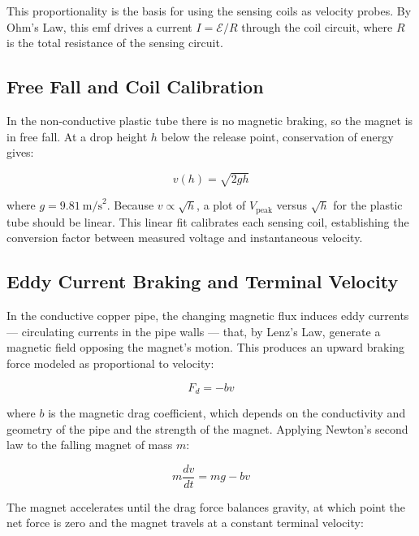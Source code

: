\documentclass[11pt]{article}
\begin{document}
\noindent This proportionality is the basis for using the sensing coils as velocity probes. By
Ohm's Law, this emf drives a current $I = \mathcal{E}/R$ through the coil circuit, where $R$ is
the total resistance of the sensing circuit.

\subsection*{Free Fall and Coil Calibration}

In the non-conductive plastic tube there is no magnetic braking, so the magnet is in free fall.
At a drop height $h$ below the release point, conservation of energy gives:

\begin{equation}
    v(h) = \sqrt{2gh}
    \label{eq:freefall}
\end{equation}

\noindent where $g = 9.81~\text{m/s}^2$. Because $v \propto \sqrt{h}$, a plot of $V_\text{peak}$
versus $\sqrt{h}$ for the plastic tube should be linear. This linear fit calibrates each sensing
coil, establishing the conversion factor between measured voltage and instantaneous velocity.

\subsection*{Eddy Current Braking and Terminal Velocity}

In the conductive copper pipe, the changing magnetic flux induces eddy currents — circulating
currents in the pipe walls — that, by Lenz's Law, generate a magnetic field opposing the
magnet's motion. This produces an upward braking force modeled as proportional to velocity:

\begin{equation}
    F_d = -bv
    \label{eq:drag}
\end{equation}

\noindent where $b$ is the magnetic drag coefficient, which depends on the conductivity and
geometry of the pipe and the strength of the magnet. Applying Newton's second law to the
falling magnet of mass $m$:

\begin{equation}
    m\frac{dv}{dt} = mg - bv
    \label{eq:eom}
\end{equation}

\noindent The magnet accelerates until the drag force balances gravity, at which point the net
force is zero and the magnet travels at a constant terminal velocity:
\end{document}
